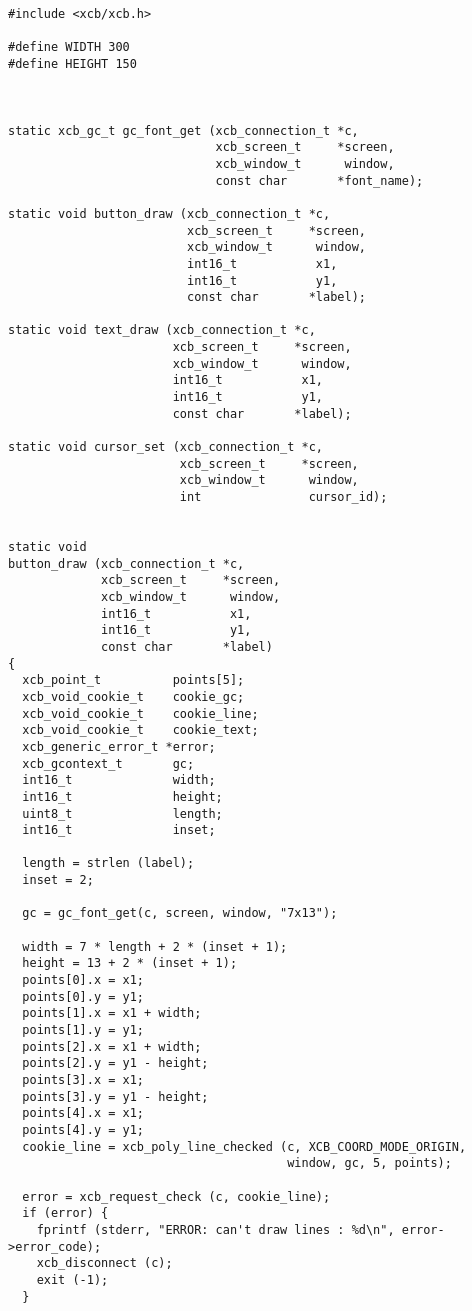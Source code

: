\documentclass[12pt,oneside,titlepage]{book}
\begin{document}
\begin{enumerate}
\begin{enumerate}
\begin{verbatim}
#include <xcb/xcb.h>

#define WIDTH 300
#define HEIGHT 150



static xcb_gc_t gc_font_get (xcb_connection_t *c,
                             xcb_screen_t     *screen,
                             xcb_window_t      window,
                             const char       *font_name);

static void button_draw (xcb_connection_t *c,
                         xcb_screen_t     *screen,
                         xcb_window_t      window,
                         int16_t           x1,
                         int16_t           y1,
                         const char       *label);

static void text_draw (xcb_connection_t *c,
                       xcb_screen_t     *screen,
                       xcb_window_t      window,
                       int16_t           x1,
                       int16_t           y1,
                       const char       *label);

static void cursor_set (xcb_connection_t *c,
                        xcb_screen_t     *screen,
                        xcb_window_t      window,
                        int               cursor_id);


static void
button_draw (xcb_connection_t *c,
             xcb_screen_t     *screen,
             xcb_window_t      window,
             int16_t           x1,
             int16_t           y1,
             const char       *label)
{
  xcb_point_t          points[5];
  xcb_void_cookie_t    cookie_gc;
  xcb_void_cookie_t    cookie_line;
  xcb_void_cookie_t    cookie_text;
  xcb_generic_error_t *error;
  xcb_gcontext_t       gc;
  int16_t              width;
  int16_t              height;
  uint8_t              length;
  int16_t              inset;

  length = strlen (label);
  inset = 2;

  gc = gc_font_get(c, screen, window, "7x13");

  width = 7 * length + 2 * (inset + 1);
  height = 13 + 2 * (inset + 1);
  points[0].x = x1;
  points[0].y = y1;
  points[1].x = x1 + width;
  points[1].y = y1;
  points[2].x = x1 + width;
  points[2].y = y1 - height;
  points[3].x = x1;
  points[3].y = y1 - height;
  points[4].x = x1;
  points[4].y = y1;
  cookie_line = xcb_poly_line_checked (c, XCB_COORD_MODE_ORIGIN,
                                       window, gc, 5, points);

  error = xcb_request_check (c, cookie_line);
  if (error) {
    fprintf (stderr, "ERROR: can't draw lines : %d\n", error->error_code);
    xcb_disconnect (c);
    exit (-1);
  }


\end{verbatim}
\end{enumerate}
\end{enumerate}
\end{document}
